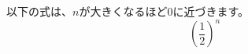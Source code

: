 \documentclass{ltjsarticle}
\begin{document}
以下の式は、$n$が大きくなるほど$0$に近づきます。
\[ \left( \frac{1}{2} \right)^{n} \]
\end{document}

